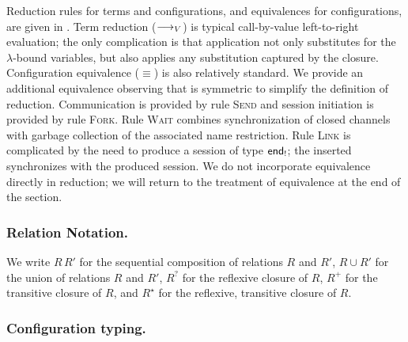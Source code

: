 \documentclass[oribibl,orivec,envcountsame]{llncs}
\begin{document}
Reduction rules for terms and configurations, and equivalences for configurations, are given in
. Term reduction ($\longrightarrow_V$) is typical call-by-value left-to-right evaluation;
the only complication is that application not only substitutes for the $\lambda$-bound variables,
but also applies any substitution captured by the closure. Configuration equivalence ($\equiv$) is
also relatively standard. We provide an additional equivalence observing that  is
symmetric to simplify the definition of reduction. Communication is provided by rule \textsc{Send}
and session initiation is provided by rule \textsc{Fork}. Rule \textsc{Wait} combines
synchronization of closed channels with garbage collection of the associated name restriction.  Rule
\textsc{Link} is complicated by the need to produce a session of type $\mathsf{end}_!$; the inserted
 synchronizes with the produced session. We do not incorporate equivalence directly in
reduction; we will return to the treatment of equivalence at the end of the section.

\subsubsection{Relation Notation.}
We write $R\,R'$ for the sequential composition of relations $R$ and $R'$, $R \cup R'$ for the union
of relations $R$ and $R'$, $R^?$ for the reflexive closure of $R$, $R^+$ for the transitive closure
of $R$, and $R^\star$ for the reflexive, transitive closure of $R$.

\subsubsection{Configuration typing.}
\end{document}
